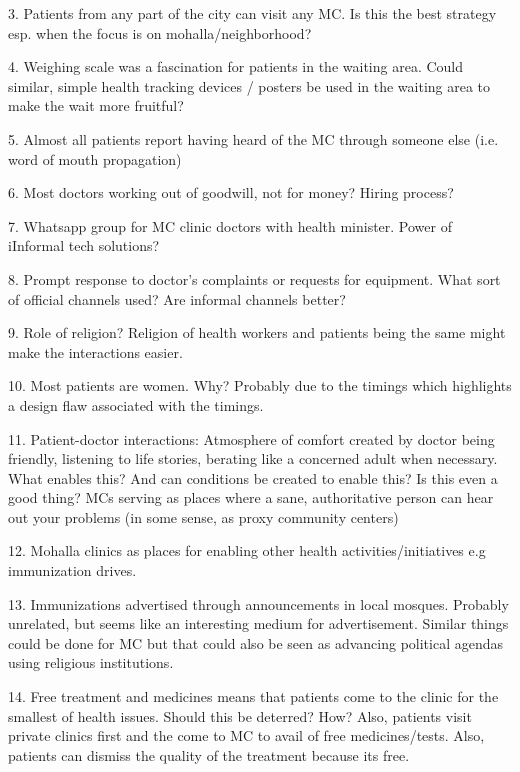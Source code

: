 3. Patients from any part of the city can visit any MC. Is this the best strategy esp. when the focus is on mohalla/neighborhood?

4. Weighing scale was a fascination for patients in the waiting area. Could similar, simple health tracking devices / posters be used in the waiting area to make the wait more fruitful?

5. Almost all patients report having heard of the MC through someone else (i.e. word of mouth propagation)

6. Most doctors working out of goodwill, not for money? Hiring process?

7. Whatsapp group for MC clinic doctors with health minister. Power of iInformal tech solutions?

8. Prompt response to doctor's complaints or requests for equipment. What sort of official channels used? Are informal channels better?

9. Role of religion? Religion of health workers and patients being the same might make the interactions easier.

10. Most patients are women. Why? Probably due to the timings which highlights a design flaw associated with the timings.

11. Patient-doctor interactions: Atmosphere of comfort created by doctor being friendly, listening to life stories, berating like a concerned adult when necessary. What enables this? And can conditions be created to enable this? Is this even a good thing? MCs serving as places where a sane, authoritative person can hear out your problems (in some sense, as proxy community centers)

12. Mohalla clinics as places for enabling other health activities/initiatives e.g immunization drives.

13. Immunizations advertised through announcements in local mosques. Probably unrelated, but seems like an interesting medium for advertisement. Similar things could be done for MC but that could also be seen as advancing political agendas using religious institutions.

14. Free treatment and medicines means that patients come to the clinic for the smallest of health issues. Should this be deterred? How? Also, patients visit private clinics first and the come to MC to avail of free medicines/tests. Also, patients can dismiss the quality of the treatment because its free. 

